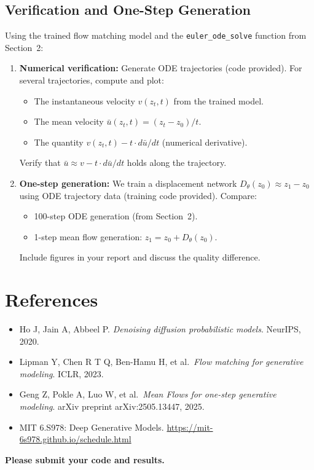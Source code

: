 \documentclass[11pt]{article}
\begin{document}
\subsection{Verification and One-Step Generation}

Using the trained flow matching model and the \texttt{euler\_ode\_solve} function from Section~2:

\begin{enumerate}
    \item \textbf{Numerical verification:} Generate ODE trajectories (code provided). For several trajectories, compute and plot:
    \begin{itemize}
        \item The instantaneous velocity \( v(z_t, t) \) from the trained model.
        \item The mean velocity \( \bar{u}(z_t, t) = (z_t - z_0)/t \).
        \item The quantity \( v(z_t, t) - t \cdot d\bar{u}/dt \) (numerical derivative).
    \end{itemize}
    Verify that \( \bar{u} \approx v - t \cdot d\bar{u}/dt \) holds along the trajectory.

    \item \textbf{One-step generation:} We train a displacement network \( D_\theta(z_0) \approx z_1 - z_0 \) using ODE trajectory data (training code provided). Compare:
    \begin{itemize}
        \item 100-step ODE generation (from Section~2).
        \item 1-step mean flow generation: \( z_1 = z_0 + D_\theta(z_0) \).
    \end{itemize}
    Include figures in your report and discuss the quality difference.
\end{enumerate}

\hrulefill

\section*{References}

\begin{itemize}
    \item Ho J, Jain A, Abbeel P. \emph{Denoising diffusion probabilistic models}. NeurIPS, 2020.
    \item Lipman Y, Chen R T Q, Ben-Hamu H, et al.\ \emph{Flow matching for generative modeling}. ICLR, 2023.
    \item Geng Z, Pokle A, Luo W, et al.\ \emph{Mean Flows for one-step generative modeling}. arXiv preprint arXiv:2505.13447, 2025.
    \item MIT 6.S978: Deep Generative Models. \url{https://mit-6s978.github.io/schedule.html}
\end{itemize}

\bigskip
\noindent\textbf{Please submit your code and results.}
\end{document}

